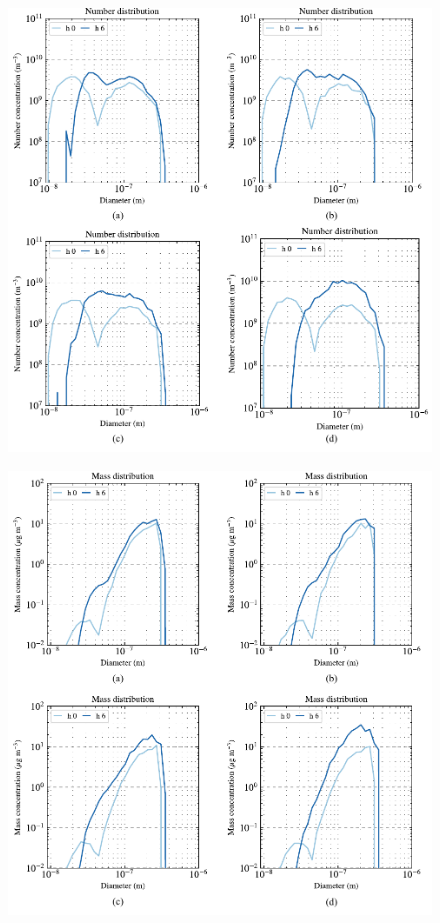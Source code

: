 \begin{figure}[t]
  \centering
    \includegraphics[width=\textwidth]{figures/chapter5/number-distribution-plots.pdf}
    \caption{}
    \label{fig:number-dists}
\end{figure}

\begin{figure}[t]
  \centering
    \includegraphics[width=\textwidth]{figures/chapter5/mass-distribution-plots.pdf}
    \caption{}
    \label{fig:mass-dists}
\end{figure}


